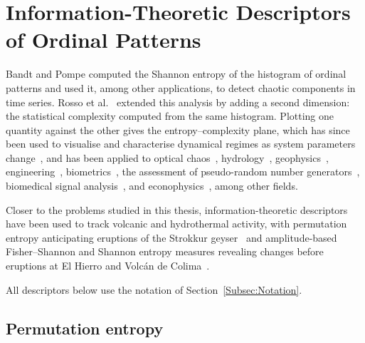 \section{Information-Theoretic Descriptors of Ordinal Patterns} \label{Sec:BackgroundKnowledge}

Bandt and Pompe computed the Shannon entropy of the histogram of ordinal patterns and used it, among other applications, to detect chaotic components in time series. Rosso et al.~\cite{EEGAnalysisUsingWaveletBasedInformationTools} extended this analysis by adding a second dimension: the statistical complexity computed from the same histogram. Plotting one quantity against the other gives the entropy--complexity plane, which has since been used to visualise and characterise dynamical regimes as system parameters change~\cite{Bandt2005,Cao2004,DeMicco2012a,Kowalski2007,Kowalski2011b,Rosso2010a,Zunino2010a,Zunino2012a}, and has been applied to optical chaos~\cite{Liu2016f,Soriano2011a,Toomey2014,Yang2015e,Zunino2011a}, hydrology~\cite{Lange2013,Serinaldi2014,Stosic2016}, geophysics~\cite{Consolini2014,Saco2010,Sippel2016}, engineering~\cite{Aquino2017,Aquino2015,Redelico2017a,Yan2012}, biometrics~\cite{Rosso2016}, the assessment of pseudo-random number generators~\cite{DeMicco2008,DeMicco2009}, biomedical signal analysis~\cite{Li2014b,Li2008b,Li2007,Liang2015b,Montani2015a,Montani2014,Montani2014a,Montani2015,Morabito2012,Parlitz2012,Perinelli2025,Perinelli2019,Zanin2012}, and econophysics~\cite{Bariviera2015a,Bariviera2015,Bariviera2016,Zanin2012,Zunino2016a,Zunino2009,Zunino2010}, among other fields.

Closer to the problems studied in this thesis, information-theoretic descriptors have been used to track volcanic and hydrothermal activity, with permutation entropy anticipating eruptions of the Strokkur geyser~\cite{Sudibyo2022} and amplitude-based Fisher--Shannon and Shannon entropy measures revealing changes before eruptions at El Hierro and Volcán de Colima~\cite{ReyDevesa2023, Telesca2014}.

All descriptors below use the notation of Section~\ref{Subsec:Notation}.

\subsection{Permutation entropy}


